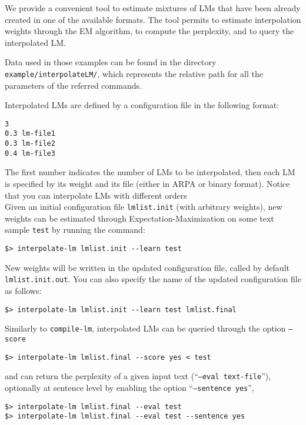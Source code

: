 We provide a convenient tool to estimate mixtures of LMs that have been already 
created in one of the available formats.  The tool permits to estimate interpolation
weights through the EM algorithm, to compute the perplexity, and to query the interpolated
LM. 

\noindent
Data used in those examples can be found in the directory {\tt example/interpolateLM/},
which represents the relative path for all the parameters of the referred commands.

\noindent
Interpolated LMs are defined by a configuration file in the following format:
\begin{verbatim}
3
0.3 lm-file1
0.3 lm-file2
0.4 lm-file3
\end{verbatim}

\noindent
The first number indicates the number of LMs to be interpolated, then each LM is specified
by its weight and its file (either in ARPA or binary format). Notice that you can interpolate
LMs with different orders\\

\noindent
Given an initial configuration file {\tt lmlist.init} (with arbitrary weights), new weights can be estimated
through Expectation-Maximization on some text sample {\tt test} by running the command:
\begin{verbatim}
$> interpolate-lm lmlist.init --learn test
\end{verbatim}
\noindent
New weights will be written in the updated configuration file, called by default {\tt lmlist.init.out}.
You can also specify the name of the updated configuration file as follows:

\begin{verbatim}
$> interpolate-lm lmlist.init --learn test lmlist.final
\end{verbatim}


\noindent
Similarly to {\tt compile-lm}, interpolated LMs can be queried through the option {\tt --score}

\begin{verbatim}
$> interpolate-lm lmlist.final --score yes < test
\end{verbatim}

\noindent
and can return the perplexity of a given input text (``{\tt --eval text-file}''), optionally  at sentence level  by enabling the option ``{\tt --sentence yes}'',

\begin{verbatim}
$> interpolate-lm lmlist.final --eval test 
$> interpolate-lm lmlist.final --eval test --sentence yes
\end{verbatim}

